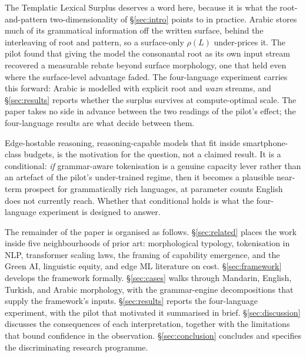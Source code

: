 The Templatic Lexical Surplus deserves a word here, because it is what the root-and-pattern two-dimensionality of \S\ref{sec:intro} points to in practice. Arabic stores much of its grammatical information off the written surface, behind the interleaving of root and pattern, so a surface-only $\rho(L)$ under-prices it. The pilot found that giving the model the consonantal root as its own input stream recovered a measurable rebate beyond surface morphology, one that held even where the surface-level advantage faded. The four-language experiment carries this forward: Arabic is modelled with explicit root and \emph{wazn} streams, and \S\ref{sec:results} reports whether the surplus survives at compute-optimal scale. The paper takes no side in advance between the two readings of the pilot's effect; the four-language results are what decide between them.

Edge-hostable reasoning, reasoning-capable models that fit inside smartphone-class budgets, is the motivation for the question, not a claimed result. It is a conditional: \emph{if} grammar-aware tokenisation is a genuine capacity lever rather than an artefact of the pilot's under-trained regime, then it becomes a plausible near-term prospect for grammatically rich languages, at parameter counts English does not currently reach. Whether that conditional holds is what the four-language experiment is designed to answer.

The remainder of the paper is organised as follows. \S\ref{sec:related} places the work inside five neighbourhoods of prior art: morphological typology, tokenisation in NLP, transformer scaling laws, the framing of capability emergence, and the Green AI, linguistic equity, and edge ML literature on cost. \S\ref{sec:framework} develops the framework formally. \S\ref{sec:cases} walks through Mandarin, English, Turkish, and Arabic morphology, with the grammar-engine decompositions that supply the framework's inputs. \S\ref{sec:results} reports the four-language experiment, with the pilot that motivated it summarised in brief. \S\ref{sec:discussion} discusses the consequences of each interpretation, together with the limitations that bound confidence in the observation. \S\ref{sec:conclusion} concludes and specifies the discriminating research programme.
